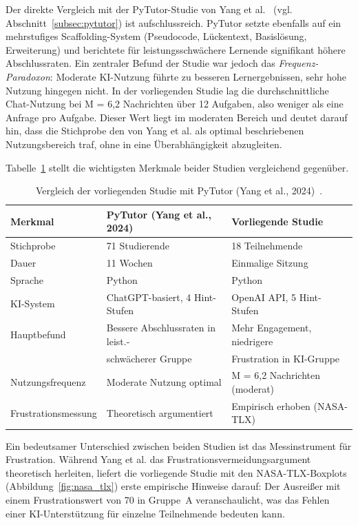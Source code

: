 Der direkte Vergleich mit der PyTutor-Studie von Yang et al.~\cite{yang2024pytutor} (vgl. Abschnitt~\ref{subsec:pytutor}) ist aufschlussreich. PyTutor setzte ebenfalls auf ein mehrstufiges Scaffolding-System (Pseudocode, Lückentext, Basislösung, Erweiterung) und berichtete für leistungsschwächere Lernende signifikant höhere Abschlussraten. Ein zentraler Befund der Studie war jedoch das \textit{Frequenz-Paradoxon}: Moderate KI-Nutzung führte zu besseren Lernergebnissen, sehr hohe Nutzung hingegen nicht. In der vorliegenden Studie lag die durchschnittliche Chat-Nutzung bei M = 6{,}2 Nachrichten über 12 Aufgaben, also weniger als eine Anfrage pro Aufgabe. Dieser Wert liegt im moderaten Bereich und deutet darauf hin, dass die Stichprobe den von Yang et al. als optimal beschriebenen Nutzungsbereich traf, ohne in eine Überabhängigkeit abzugleiten.

Tabelle~\ref{tab:pytutor_vergleich} stellt die wichtigsten Merkmale beider Studien vergleichend gegenüber.

\begin{table}[htbp]
\centering
\begin{tabular}{lll}
\toprule
\textbf{Merkmal} & \textbf{PyTutor (Yang et al., 2024)} & \textbf{Vorliegende Studie} \\
\midrule
Stichprobe & 71 Studierende & 18 Teilnehmende \\
Dauer & 11 Wochen & Einmalige Sitzung \\
Sprache & Python & Python \\
KI-System & ChatGPT-basiert, 4 Hint-Stufen & OpenAI API, 5 Hint-Stufen \\
Hauptbefund & Bessere Abschlussraten in leist.- & Mehr Engagement, niedrigere \\
            & schwächerer Gruppe & Frustration in KI-Gruppe \\
Nutzungsfrequenz & Moderate Nutzung optimal & M = 6{,}2 Nachrichten (moderat) \\
Frustrationsmessung & Theoretisch argumentiert & Empirisch erhoben (NASA-TLX) \\
\bottomrule
\end{tabular}
\caption{Vergleich der vorliegenden Studie mit PyTutor (Yang et al., 2024)~\cite{yang2024pytutor}.}
\label{tab:pytutor_vergleich}
\end{table}

Ein bedeutsamer Unterschied zwischen beiden Studien ist das Messin\-strument für Frustration. Während Yang et al. das Frustrationsvermeidungsargument theoretisch herleiten, liefert die vorliegende Studie mit den NASA-TLX-Boxplots (Abbildung~\ref{fig:nasa_tlx}) erste empirische Hinweise darauf: Der Ausreißer mit einem Frustrationswert von 70 in Gruppe~A veranschaulicht, was das Fehlen einer KI-Unterstützung für einzelne Teilnehmende bedeuten kann.

